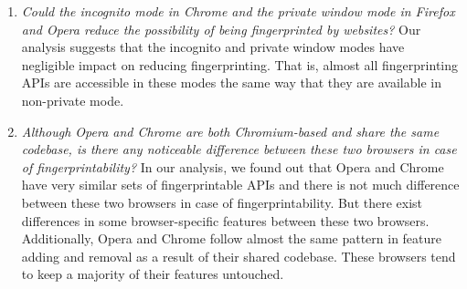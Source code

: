 \begin{enumerate}

\item {\em Could the incognito mode in Chrome and the private window mode in
  Firefox and Opera reduce the possibility of being fingerprinted by websites?} Our analysis
  suggests that the incognito and private window modes have negligible impact on
  reducing fingerprinting. That is, almost all fingerprinting APIs are accessible
  in these modes the same way that they are available in non-private mode.
    
\item {\em Although Opera and Chrome are both Chromium-based and share the same codebase,
  is there any noticeable difference between these two browsers in case of fingerprintability?}
  In our analysis, we found out that Opera and Chrome have very similar sets of fingerprintable APIs
  and there is not much difference between these two browsers in case of fingerprintability. But there exist differences in some browser-specific features between these two browsers.
  Additionally, Opera and Chrome follow almost the same pattern in feature adding and removal as a result of their shared codebase. These browsers tend to keep a majority of their features untouched.
\end{enumerate}

